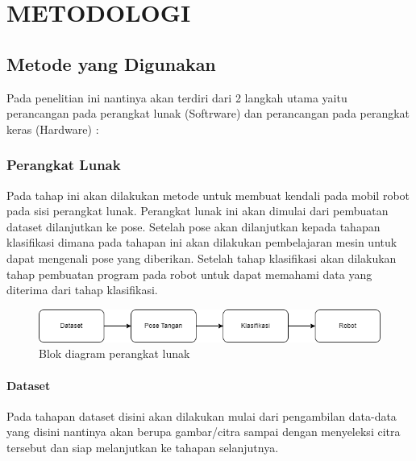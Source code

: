 \chapter{METODOLOGI}


\section{Metode yang Digunakan}

Pada penelitian ini nantinya akan terdiri dari 2 langkah utama yaitu perancangan pada perangkat lunak (Softrware) dan perancangan pada perangkat keras (Hardware) :

\subsection{Perangkat Lunak}
Pada tahap ini akan dilakukan metode untuk membuat kendali pada mobil robot pada sisi perangkat lunak. Perangkat lunak ini akan dimulai dari pembuatan dataset dilanjutkan ke pose. Setelah pose akan dilanjutkan kepada tahapan klasifikasi dimana pada tahapan ini akan dilakukan pembelajaran mesin untuk dapat mengenali pose yang diberikan. Setelah tahap klasifikasi akan dilakukan tahap pembuatan program pada robot untuk dapat memahami data yang diterima dari tahap klasifikasi.

\begin{figure}[!h]
	\centering
	\includegraphics[width=1\linewidth]{gambar/gambar3.1}
	\caption{Blok diagram perangkat lunak}
	\label{fig:gambar31}
\end{figure}

\subsubsection{Dataset}
  Pada tahapan dataset disini akan dilakukan mulai dari pengambilan data-data yang disini nantinya akan berupa gambar/citra sampai dengan menyeleksi citra tersebut dan siap melanjutkan ke tahapan selanjutnya.

